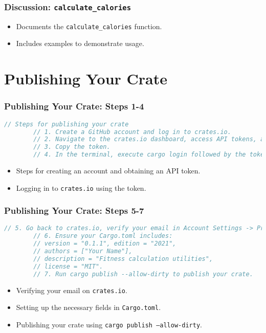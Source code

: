 \documentclass[aspectratio=169, table]{beamer}
\begin{document}
\begin{frame}[fragile]
\frametitle{Discussion: \texttt{calculate\_calories}}
\begin{itemize}
\item Documents the \texttt{calculate\_calories} function.
\item Includes examples to demonstrate usage.
\end{itemize}
\end{frame}

\section{Publishing Your Crate}

\begin{frame}[fragile]
	\frametitle{Publishing Your Crate: Steps 1-4}
	\begin{lstlisting}[language=Rust]
		// Steps for publishing your crate
		// 1. Create a GitHub account and log in to crates.io.
		// 2. Navigate to the crates.io dashboard, access API tokens, and create a new token.
		// 3. Copy the token.
		// 4. In the terminal, execute cargo login followed by the token from crates.io.
	\end{lstlisting}
	\begin{itemize}
		\item Steps for creating an account and obtaining an API token.
		\item Logging in to \texttt{crates.io} using the token.
	\end{itemize}
\end{frame}

\begin{frame}[fragile]
	\frametitle{Publishing Your Crate: Steps 5-7}
	\begin{lstlisting}[language=Rust]
		// 5. Go back to crates.io, verify your email in Account Settings -> Profile -> Email -> Save.
		// 6. Ensure your Cargo.toml includes:
		// version = "0.1.1", edition = "2021",
		// authors = ["Your Name"],
		// description = "Fitness calculation utilities",
		// license = "MIT".
		// 7. Run cargo publish --allow-dirty to publish your crate.
	\end{lstlisting}
	\begin{itemize}
		\item Verifying your email on \texttt{crates.io}.
		\item Setting up the necessary fields in \texttt{Cargo.toml}.
		\item Publishing your crate using \texttt{cargo publish --allow-dirty}.
	\end{itemize}
\end{frame}
\end{document}
